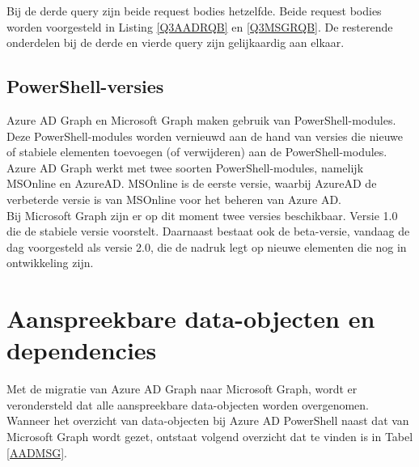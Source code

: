 Bij de derde query zijn beide request bodies hetzelfde. Beide request bodies worden voorgesteld in Listing \ref{Q3AADRQB} en \ref{Q3MSGRQB}. De resterende onderdelen bij de derde en vierde query zijn gelijkaardig aan elkaar.

\subsection{PowerShell-versies}


Azure \ac{AD} Graph en Microsoft Graph maken gebruik van PowerShell-modules. Deze PowerShell-modules worden vernieuwd aan de hand van versies die nieuwe of stabiele elementen toevoegen (of verwijderen) aan de PowerShell-modules. \\

Azure \ac{AD} Graph werkt met twee soorten PowerShell-modules, namelijk MSOnline en AzureAD. MSOnline is de eerste versie, waarbij AzureAD de verbeterde versie is van MSOnline voor het beheren van Azure \ac{AD}. \\

Bij Microsoft Graph zijn er op dit moment twee versies beschikbaar. Versie 1.0 die de stabiele versie voorstelt. Daarnaast bestaat ook de beta-versie, vandaag de dag voorgesteld als versie 2.0, die de nadruk legt op nieuwe elementen die nog in ontwikkeling zijn. \\ 


\section{Aanspreekbare data-objecten en dependencies}




Met de migratie van Azure \ac{AD} Graph naar Microsoft Graph, wordt er verondersteld dat alle aanspreekbare data-objecten worden overgenomen. Wanneer het overzicht van data-objecten bij Azure \ac{AD} PowerShell naast dat van Microsoft Graph wordt gezet, ontstaat volgend overzicht dat te vinden is in Tabel \ref{AADMSG}. \\

